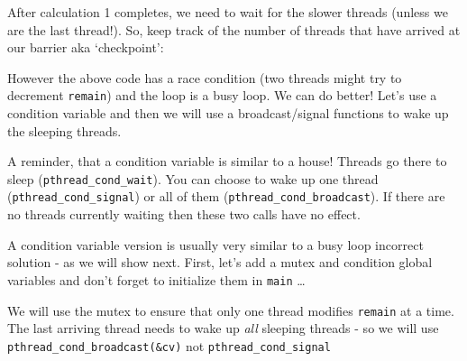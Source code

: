 After calculation 1 completes, we need to wait for the slower threads
(unless we are the last thread!). So, keep track of the number of
threads that have arrived at our barrier aka `checkpoint':

\begin{Shaded}
\begin{Highlighting}[]
 


 \NormalTok{) \{} \NormalTok{\}}
 \NormalTok{\{}
   \NormalTok{) \{ } \NormalTok{\}}
\NormalTok{\}}
\end{Highlighting}
\end{Shaded}

However the above code has a race condition (two threads might try to
decrement \texttt{remain}) and the loop is a busy loop. We can do
better! Let's use a condition variable and then we will use a
broadcast/signal functions to wake up the sleeping threads.

A reminder, that a condition variable is similar to a house! Threads go
there to sleep (\texttt{pthread\_cond\_wait}). You can choose to wake up
one thread (\texttt{pthread\_cond\_signal}) or all of them
(\texttt{pthread\_cond\_broadcast}). If there are no threads currently
waiting then these two calls have no effect.

A condition variable version is usually very similar to a busy loop
incorrect solution - as we will show next. First, let's add a mutex and
condition global variables and don't forget to initialize them in
\texttt{main} \ldots{}

\begin{Shaded}
\begin{Highlighting}[]

\end{Highlighting}
\end{Shaded}

We will use the mutex to ensure that only one thread modifies
\texttt{remain} at a time. The last arriving thread needs to wake up
\emph{all} sleeping threads - so we will use
\texttt{pthread\_cond\_broadcast(\&cv)} not
\texttt{pthread\_cond\_signal}

